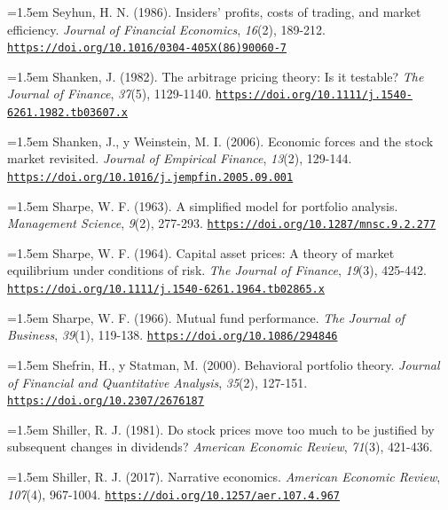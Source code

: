 \documentclass[10pt,a4paper]{article}
\begin{document}
\noindent\hangindent=1.5em Seyhun, H. N. (1986). Insiders' profits, costs of trading, and market efficiency. \textit{Journal of Financial Economics}, \textit{16}(2), 189-212. \href{https://doi.org/10.1016/0304-405X(86)90060-7}{\nolinkurl{https://doi.org/10.1016/0304-405X(86)90060-7}}

\noindent\hangindent=1.5em Shanken, J. (1982). The arbitrage pricing theory: Is it testable? \textit{The Journal of Finance}, \textit{37}(5), 1129-1140. \href{https://doi.org/10.1111/j.1540-6261.1982.tb03607.x}{\nolinkurl{https://doi.org/10.1111/j.1540-6261.1982.tb03607.x}}

\noindent\hangindent=1.5em Shanken, J., y Weinstein, M. I. (2006). Economic forces and the stock market revisited. \textit{Journal of Empirical Finance}, \textit{13}(2), 129-144. \href{https://doi.org/10.1016/j.jempfin.2005.09.001}{\nolinkurl{https://doi.org/10.1016/j.jempfin.2005.09.001}}

\noindent\hangindent=1.5em Sharpe, W. F. (1963). A simplified model for portfolio analysis. \textit{Management Science}, \textit{9}(2), 277-293. \href{https://doi.org/10.1287/mnsc.9.2.277}{\nolinkurl{https://doi.org/10.1287/mnsc.9.2.277}}

\noindent\hangindent=1.5em Sharpe, W. F. (1964). Capital asset prices: A theory of market equilibrium under conditions of risk. \textit{The Journal of Finance}, \textit{19}(3), 425-442. \href{https://doi.org/10.1111/j.1540-6261.1964.tb02865.x}{\nolinkurl{https://doi.org/10.1111/j.1540-6261.1964.tb02865.x}}

\noindent\hangindent=1.5em Sharpe, W. F. (1966). Mutual fund performance. \textit{The Journal of Business}, \textit{39}(1), 119-138. \href{https://doi.org/10.1086/294846}{\nolinkurl{https://doi.org/10.1086/294846}}

\noindent\hangindent=1.5em Shefrin, H., y Statman, M. (2000). Behavioral portfolio theory. \textit{Journal of Financial and Quantitative Analysis}, \textit{35}(2), 127-151. \href{https://doi.org/10.2307/2676187}{\nolinkurl{https://doi.org/10.2307/2676187}}

\noindent\hangindent=1.5em Shiller, R. J. (1981). Do stock prices move too much to be justified by subsequent changes in dividends? \textit{American Economic Review}, \textit{71}(3), 421-436.

\noindent\hangindent=1.5em Shiller, R. J. (2017). Narrative economics. \textit{American Economic Review}, \textit{107}(4), 967-1004. \href{https://doi.org/10.1257/aer.107.4.967}{\nolinkurl{https://doi.org/10.1257/aer.107.4.967}}
\end{document}
